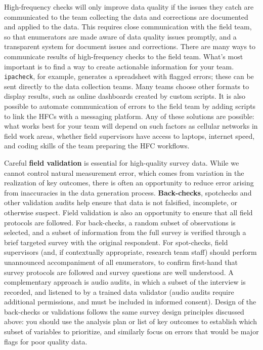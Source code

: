 High-frequency checks will only improve data quality
if the issues they catch are communicated to the team collecting the data
and corrections are documented and applied to the data.
This requires close communication with the field team, 
so that enumerators are made aware of data quality issues promptly,
and a transparent system for document issues and corrections. 
There are many ways to communicate results of high-frequency checks to the field team.
What's most important is to find a way to create actionable information for your team.
\texttt{ipacheck},
for example, generates a spreadsheet with flagged errors;
these can be sent directly to the data collection teams.
Many teams choose other formats to display results,
such as online dashboards created by custom scripts.
It is also possible to automate communication of errors to the field team
by adding scripts to link the HFCs with a messaging platform.
Any of these solutions are possible:
what works best for your team will depend on such factors as
cellular networks in field work areas, whether field supervisors have access to laptops,
internet speed, and coding skills of the team preparing the HFC workflows.

Careful \textbf{field validation} is essential for high-quality survey data.
While we cannot control natural measurement error,
which comes from variation in the realization of key outcomes,
there is often an opportunity to reduce error arising from inaccuracies in the data generation process.
\textbf{Back-checks}, spotchecks and other validation audits help ensure that 
data is not falsified, incomplete, or otherwise suspect.
Field validation is also an opportunity to ensure that all field protocols are followed.
For back-checks, a random subset of observations is selected,
and a subset of information from the full survey is
verified through a brief targeted survey with the original respondent.
For spot-checks, field supervisors (and, if contextually appropriate, research team staff)
should perform unannounced accompaniment of all enumerators, 
to confirm first-hand that survey protocols are followed and 
survey questions are well understood. 
A complementary approach is audio audits, 
in which a subset of the interview is recorded, and listened to by a trained data validator
(audio audits require additional permissions, and must be included in informed consent).
Design of the back-checks or validations follows the same survey design
principles discussed above: you should use the analysis plan
or list of key outcomes to establish which subset of variables to prioritize,
and similarly focus on errors that would be major flags for poor quality data.

